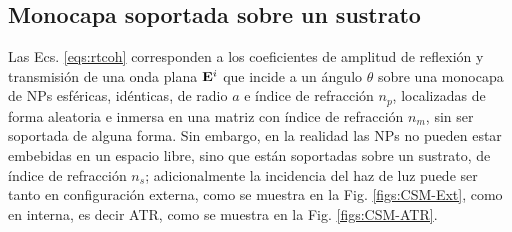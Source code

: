 	 \subsection{Monocapa soportada sobre un sustrato}
\label{ssection:CSMATR}

Las Ecs. \eqref{eqs:rtcoh} corresponden a los coeficientes de amplitud de reflexión y transmisión de una onda plana $\vb{E}^i$ que incide a un ángulo $\theta$ sobre una monocapa de NPs esféricas, idénticas, de radio $a$ e índice de refracción $n_p$, localizadas de forma aleatoria e inmersa en una matriz con índice de refracción $n_m$, sin ser soportada de alguna forma. Sin embargo, en la realidad las NPs no pueden estar embebidas en un espacio libre, sino que están soportadas sobre un sustrato, de índice de refracción $n_s$; adicionalmente la incidencia del haz de luz puede ser tanto en configuración externa, como se muestra en la Fig. \ref{figs:CSM-Ext}, como en interna, es decir ATR, como se muestra en la Fig. \ref{figs:CSM-ATR}.

